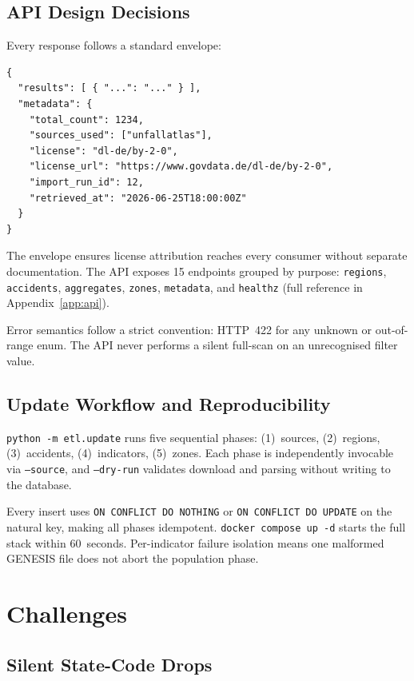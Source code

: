 \documentclass[12pt,a4paper]{article}
\begin{document}
\subsection{API Design Decisions}

Every response follows a standard envelope:

\begin{lstlisting}[language={},caption={Standard API response envelope}]
{
  "results": [ { "...": "..." } ],
  "metadata": {
    "total_count": 1234,
    "sources_used": ["unfallatlas"],
    "license": "dl-de/by-2-0",
    "license_url": "https://www.govdata.de/dl-de/by-2-0",
    "import_run_id": 12,
    "retrieved_at": "2026-06-25T18:00:00Z"
  }
}
\end{lstlisting}

The envelope ensures license attribution reaches every consumer without separate documentation. The API exposes 15 endpoints grouped by purpose: \texttt{regions}, \texttt{accidents}, \texttt{aggregates}, \texttt{zones}, \texttt{metadata}, and \texttt{healthz} (full reference in Appendix~\ref{app:api}).

Error semantics follow a strict convention: HTTP~422 for any unknown or out-of-range enum. The API never performs a silent full-scan on an unrecognised filter value.

\subsection{Update Workflow and Reproducibility}

\texttt{python -m etl.update} runs five sequential phases: (1)~sources, (2)~regions, (3)~accidents, (4)~indicators, (5)~zones. Each phase is independently invocable via \texttt{--source}, and \texttt{--dry-run} validates download and parsing without writing to the database.

Every insert uses \texttt{ON CONFLICT DO NOTHING} or \texttt{ON CONFLICT DO UPDATE} on the natural key, making all phases idempotent. \texttt{docker compose up -d} starts the full stack within 60~seconds. Per-indicator failure isolation means one malformed GENESIS file does not abort the population phase.

\section{Challenges}

\subsection{Silent State-Code Drops}
\end{document}
